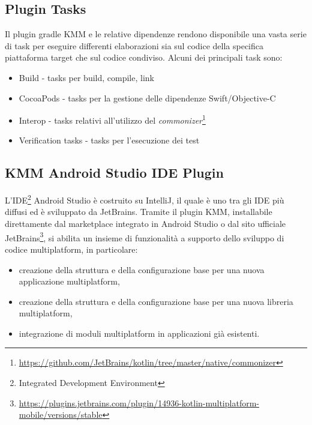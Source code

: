 \subsection{Plugin Tasks}
Il plugin gradle KMM e le relative dipendenze rendono disponibile una vasta serie di task per eseguire differenti elaborazioni sia sul codice della specifica piattaforma target che sul codice condiviso. Alcuni dei principali task sono:
\begin{itemize}
    \item Build - tasks per build, compile, link
    \item CocoaPods - tasks per la gestione delle dipendenze Swift/Objective-C
    \item Interop - tasks relativi all'utilizzo del \textit{commonizer}\footnote{\url{https://github.com/JetBrains/kotlin/tree/master/native/commonizer}}
    \item Verification tasks - tasks per l'esecuzione dei test
\end{itemize}

\subsection{KMM Android Studio IDE Plugin}
L'IDE\footnote{Integrated Development Environment} Android Studio è costruito su IntelliJ, il quale è uno tra gli IDE più diffusi ed è sviluppato da JetBrains. Tramite il plugin KMM, installabile direttamente dal marketplace integrato in Android Studio o dal sito ufficiale JetBrains\footnote{\url{https://plugins.jetbrains.com/plugin/14936-kotlin-multiplatform-mobile/versions/stable}}, si abilita un insieme di funzionalità a supporto dello sviluppo di codice multiplatform, in particolare:
\begin{itemize}
    \item creazione della struttura e della configurazione base per una nuova applicazione multiplatform,
    \item creazione della struttura e della configurazione base per una nuova libreria multiplatform,
    \item integrazione di moduli multiplatform in applicazioni già esistenti.
\end{itemize}

